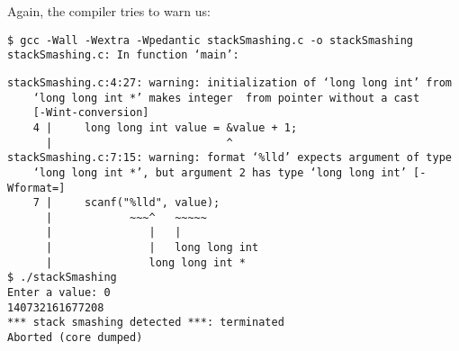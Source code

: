 Again, the compiler tries to warn us:
\begin{cmdbox}
\begin{verbatim}
$ gcc -Wall -Wextra -Wpedantic stackSmashing.c -o stackSmashing
stackSmashing.c: In function ‘main’:
\end{verbatim}
\end{cmdbox}
%
\begin{cmdbox}[]
\begin{verbatim}
stackSmashing.c:4:27: warning: initialization of ‘long long int’ from 
    ‘long long int *’ makes integer  from pointer without a cast 
    [-Wint-conversion]
    4 |     long long int value = &value + 1;
      |                           ^
stackSmashing.c:7:15: warning: format ‘%lld’ expects argument of type 
    ‘long long int *’, but argument 2 has type ‘long long int’ [-Wformat=]
    7 |     scanf("%lld", value);
      |            ~~~^   ~~~~~
      |               |   |
      |               |   long long int
      |               long long int *
$ ./stackSmashing
Enter a value: 0
140732161677208
*** stack smashing detected ***: terminated
Aborted (core dumped)
\end{verbatim}
\end{cmdbox}

